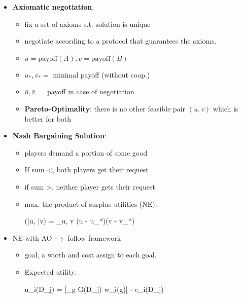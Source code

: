\documentclass[10pt,a4paper,landscape]{article}
\makeatletter
\newenvironment{myalign*}{%
  \setlength{\abovedisplayskip}{3pt}%
  \setlength{\belowdisplayskip}{3pt}%
  \start@align\@ne\st@rredtrue\m@ne
}%
{\endalign}
\makeatother
\begin{document}
\begin{multicols*}{2}
\begin{itemize}
	\item \textbf{Axiomatic negotiation}:
	\begin{itemize}
		\item fix a set of axioms s.t. solution is unique
	 	\item negotiate according to a protocol that guarantees the axioms.
	 	\item $u = \text{payoff}(A), v = \text{payoff}(B)$
	 	\item $u_*, v_* =$ minimal payoff (without coop.)
	 	\item $\bar{u}, \bar{v} = $ payoff in case of negotiation
	 	\item \textbf{Pareto-Optimality}: there is no other feasible pair $(u, v)$ which is better for both
	\end{itemize} 
	
	\item \textbf{Nash Bargaining Solution}:
	\begin{itemize}
		\item players demand a portion of some good
		\item If sum <, both players get their request
		\item if sum >, neither player gets their request
		\item max. the product of surplus utilities (NE):
		\begin{myalign*}
		    (\bar{u}, \bar{v}) = \sup_{u, v} (u - u_*)(v - v_*)
		\end{myalign*}
	\end{itemize}
	\item NE with AO $\rightarrow$ follow framework
	\begin{itemize}
		\item goal, a worth and cost assign to each goal.
		\item Expected utility:
		\begin{myalign*}
		    u_i(D_j) = [\sum_{g \in G(D_j)} w_i(g)] - c_i(D_j) 
		\end{myalign*}
	\end{itemize}

	\begin{comment}
		\item \textbf{Pareto-optimal}: $\bar{D}$ is pareto-optimal if there doesn't exist another deal $D_k$ such that for all agents, $u_i(D_k) \geq u_i(\bar{D})$ and for at least one agent, $u_i(D_k) > u_i(\bar{D})$  (i.o.w. $\bar{D}$ is not strictly optimal)
	\end{comment}
	

\end{itemize}
\end{multicols*}
\end{document}
